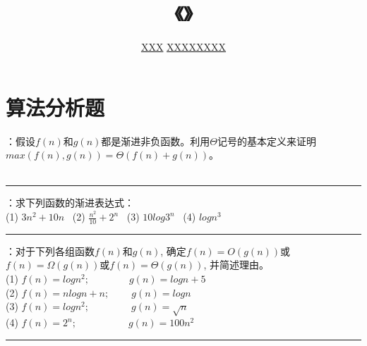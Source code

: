 \documentclass[UTF8,16pt]{article} %
\title{《\heiti{算法设计与分析}》\heiti{第{\color{red}1}次作业}}
\author{\kaishu{姓名：}\underline{XXX} \quad\quad\quad\quad\quad  \kaishu{学号：}\underline{XXXXXXXX}}
\date{}
\begin{document}
	
\maketitle
\vbox{} %

\section*{\textbf{算法分析题}}
：假设$f(n)$和$g(n)$都是渐进非负函数。利用$\Theta$记号的基本定义来证明$max(f(n),g(n)) = \Theta(f(n) + g(n))$。\\
{}\\
\rule[0pt]{14.3cm}{0.05em}
\newline

\noindent
\vbox{} %
：求下列函数的渐进表达式：\\
(1) $3n^2+10n$ \quad\quad\  (2) $\frac{n^2}{10}+2^n$ \quad\quad\ (3) $10log3^n$  \quad\quad\ (4) $logn^3$\\
{}
\newline

\noindent
\rule[0pt]{14.3cm}{0.05em}

\vbox{} %
：对于下列各组函数$f(n)$和$g(n)$, 确定$f(n)=O(g(n))$或$f(n)=\Omega(g(n))$或$f(n)=\Theta(g(n))$, 并简述理由。\\
(1) $f(n)=logn^2;\quad\quad\quad\quad g(n)=logn+5$\\
(2) $f(n)=nlogn+n;\quad\quad\ g(n)=logn$\\
(3) $f(n)=logn^2;\quad\quad\quad\quad\ g(n)=\sqrt{n}$\\
(4) $f(n)=2^n;\quad\quad\quad\quad\quad\ g(n)=100n^2$\\
{}
\newline

\noindent
\rule[0pt]{14.3cm}{0.05em}


%
\end{document}
